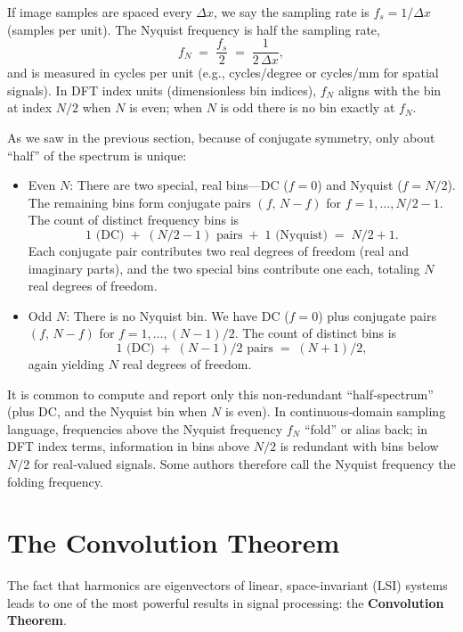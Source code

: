 \documentclass[
  letterpaper,
]{book}
\begin{document}
If image samples are spaced every \(\Delta x\), we say the sampling rate
is \(f_s = 1/\Delta x\) (samples per unit). The Nyquist frequency is
half the sampling rate, \[
f_N \;=\; \frac{f_s}{2} \;=\; \frac{1}{2\,\Delta x},
\] and is measured in cycles per unit (e.g., cycles/degree or cycles/mm
for spatial signals). In DFT index units (dimensionless bin indices),
\(f_N\) aligns with the bin at index \(N/2\) when \(N\) is even; when
\(N\) is odd there is no bin exactly at \(f_N\).

As we saw in the previous section, because of conjugate symmetry, only
about ``half'' of the spectrum is unique:

\begin{itemize}
\item
  Even \(N\): There are two special, real bins---DC (\(f=0\)) and
  Nyquist (\(f=N/2\)). The remaining bins form conjugate pairs
  \((f,\,N-f)\) for \(f=1,\ldots,N/2-1\). The count of distinct
  frequency bins is \[
    1 \text{ (DC)} \;+\; (N/2-1) \text{ pairs} \;+\; 1 \text{ (Nyquist)} \;=\; N/2 + 1.
    \] Each conjugate pair contributes two real degrees of freedom (real
  and imaginary parts), and the two special bins contribute one each,
  totaling \(N\) real degrees of freedom.
\item
  Odd \(N\): There is no Nyquist bin. We have DC (\(f=0\)) plus
  conjugate pairs \((f,\,N-f)\) for \(f=1,\ldots,(N-1)/2\). The count of
  distinct bins is \[
    1 \text{ (DC)} \;+\; (N-1)/2 \text{ pairs} \;=\; (N+1)/2,
    \] again yielding \(N\) real degrees of freedom.
\end{itemize}

It is common to compute and report only this non‑redundant
``half‑spectrum'' (plus DC, and the Nyquist bin when \(N\) is even). In
continuous‑domain sampling language, frequencies above the Nyquist
frequency \(f_N\) ``fold'' or alias back; in DFT index terms,
information in bins above \(N/2\) is redundant with bins below \(N/2\)
for real‑valued signals. Some authors therefore call the Nyquist
frequency the folding frequency.

\section{The Convolution Theorem}\label{sec-ls-convolution-theorem}

The fact that harmonics are eigenvectors of linear, space-invariant
(LSI) systems leads to one of the most powerful results in signal
processing: the \textbf{Convolution Theorem}.
\end{document}
